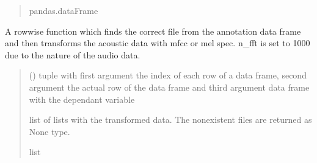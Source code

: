 \documentclass[letterpaper,10pt,english]{sphinxmanual}
\begin{document}
\begin{fulllineitems}
\begin{fulllineitems}
\begin{quote}
\begin{description}
\sphinxAtStartPar
pandas.dataFrame

\end{description}\end{quote}

\end{fulllineitems}


\begin{fulllineitems}
\label{\detokenize{BeeClassification:BeeClassification.BeeClassification.data_transformation_row}}
\pysigstartsignatures
{}
\pysigstopsignatures
\sphinxAtStartPar
A row\sphinxhyphen{}wise function which finds the correct file from the annotation data frame and then transforms the acoustic data with mfcc or mel spec. n\_fft is set to 1000 due to the nature of the audio data.
\begin{quote}\begin{description}
\sphinxAtStartPar
{} () \textendash{} tuple with first argument the index of each row of a data frame, second argument \sphinxhyphen{} the actual row of the data frame and third argument \sphinxhyphen{} data frame with the dependant variable

\sphinxAtStartPar
list of lists with the transformed data. The non\sphinxhyphen{}existent files are returned as None type.

\sphinxAtStartPar
list

\end{description}\end{quote}

\end{fulllineitems}



\end{fulllineitems}
\end{document}
